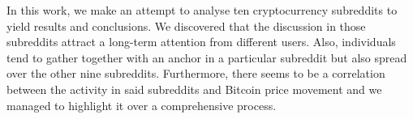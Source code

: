 In this work, we make an attempt to analyse ten cryptocurrency subreddits to yield results and conclusions. We discovered that the discussion in those subreddits attract a long-term attention from different users. Also, individuals tend to gather together with an anchor in a particular subreddit but also spread over the other nine subreddits. Furthermore, there seems to be a correlation between the activity in said subreddits and Bitcoin price movement and we managed to highlight it over a comprehensive process.
